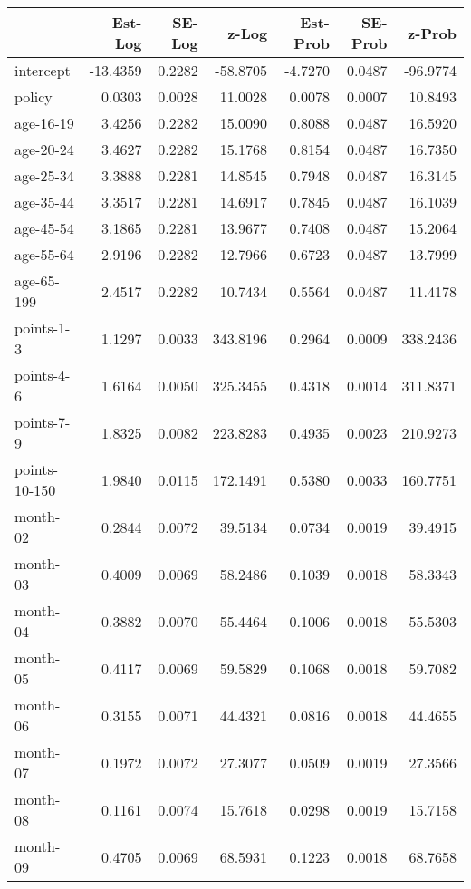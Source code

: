\documentclass[10pt]{article}
\begin{document}
\begin{table}[ht]
\centering
\begin{tabular}{lrrrrrr}
  \hline
 & Est-Log & SE-Log & z-Log & Est-Prob & SE-Prob & z-Prob \\ 
  \hline
intercept & -13.4359 & 0.2282 & -58.8705 & -4.7270 & 0.0487 & -96.9774 \\ 
  policy & 0.0303 & 0.0028 & 11.0028 & 0.0078 & 0.0007 & 10.8493 \\ 
  age-16-19 & 3.4256 & 0.2282 & 15.0090 & 0.8088 & 0.0487 & 16.5920 \\ 
  age-20-24 & 3.4627 & 0.2282 & 15.1768 & 0.8154 & 0.0487 & 16.7350 \\ 
  age-25-34 & 3.3888 & 0.2281 & 14.8545 & 0.7948 & 0.0487 & 16.3145 \\ 
  age-35-44 & 3.3517 & 0.2281 & 14.6917 & 0.7845 & 0.0487 & 16.1039 \\ 
  age-45-54 & 3.1865 & 0.2281 & 13.9677 & 0.7408 & 0.0487 & 15.2064 \\ 
  age-55-64 & 2.9196 & 0.2282 & 12.7966 & 0.6723 & 0.0487 & 13.7999 \\ 
  age-65-199 & 2.4517 & 0.2282 & 10.7434 & 0.5564 & 0.0487 & 11.4178 \\ 
  points-1-3 & 1.1297 & 0.0033 & 343.8196 & 0.2964 & 0.0009 & 338.2436 \\ 
  points-4-6 & 1.6164 & 0.0050 & 325.3455 & 0.4318 & 0.0014 & 311.8371 \\ 
  points-7-9 & 1.8325 & 0.0082 & 223.8283 & 0.4935 & 0.0023 & 210.9273 \\ 
  points-10-150 & 1.9840 & 0.0115 & 172.1491 & 0.5380 & 0.0033 & 160.7751 \\ 
  month-02 & 0.2844 & 0.0072 & 39.5134 & 0.0734 & 0.0019 & 39.4915 \\ 
  month-03 & 0.4009 & 0.0069 & 58.2486 & 0.1039 & 0.0018 & 58.3343 \\ 
  month-04 & 0.3882 & 0.0070 & 55.4464 & 0.1006 & 0.0018 & 55.5303 \\ 
  month-05 & 0.4117 & 0.0069 & 59.5829 & 0.1068 & 0.0018 & 59.7082 \\ 
  month-06 & 0.3155 & 0.0071 & 44.4321 & 0.0816 & 0.0018 & 44.4655 \\ 
  month-07 & 0.1972 & 0.0072 & 27.3077 & 0.0509 & 0.0019 & 27.3566 \\ 
  month-08 & 0.1161 & 0.0074 & 15.7618 & 0.0298 & 0.0019 & 15.7158 \\ 
  month-09 & 0.4705 & 0.0069 & 68.5931 & 0.1223 & 0.0018 & 68.7658 \\ 

\end{tabular}
\end{table}
\end{document}
